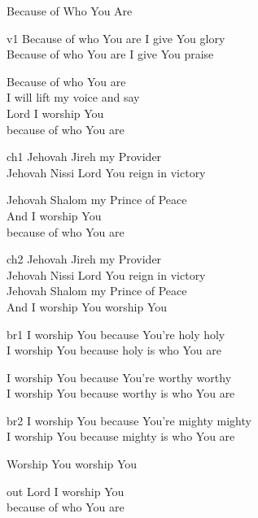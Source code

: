 \begin{song}{Because of Who You Are}
    

    \begin{songframe}{v1}
        Because of who You are I give You glory \\
        Because of who You are I give You praise

        Because of who You are \\
        I will lift my voice and say \\
        Lord I worship You \\
        because of who You are
    \end{songframe}

    \begin{songframe}{ch1}
        Jehovah Jireh my Provider \\
        Jehovah Nissi Lord You reign in victory

        Jehovah Shalom my Prince of Peace \\
        And I worship You \\
        because of who You are
    \end{songframe}

    \begin{songframe}{ch2}
        Jehovah Jireh my Provider \\
        Jehovah Nissi Lord You reign in victory \\
        Jehovah Shalom my Prince of Peace \\
        And I worship You worship You
    \end{songframe}

    \begin{songframe}{br1}
        I worship You because You're holy holy \\
        I worship You because holy is who You are

        I worship You because You're worthy worthy \\
        I worship You because worthy is who You are
    \end{songframe}

    \begin{songframe}{br2}
        I worship You because You're mighty mighty \\
        I worship You because mighty is who You are

        Worship You worship You
    \end{songframe}

    \begin{songframe}{out}
        Lord I worship You \\
        because of who You are
    \end{songframe}

\end{song}
